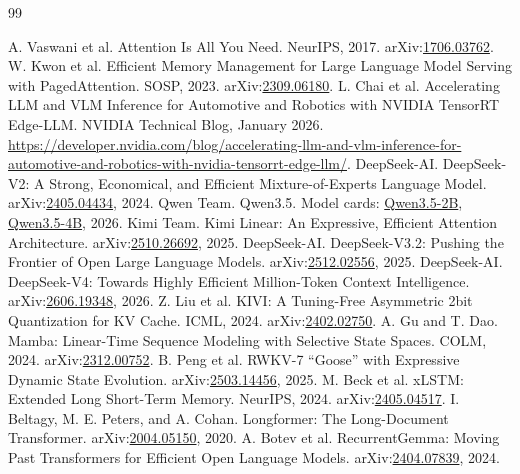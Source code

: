 \begingroup
\small
{}
\setlength{\parskip}{0pt}
\begin{thebibliography}{99}
\raggedright
\setlength{\itemsep}{0pt}
 A. Vaswani et al. Attention Is All You Need. NeurIPS, 2017. arXiv:\href{https://arxiv.org/abs/1706.03762}{1706.03762}.
 W. Kwon et al. Efficient Memory Management for Large Language Model Serving with PagedAttention. SOSP, 2023. arXiv:\href{https://arxiv.org/abs/2309.06180}{2309.06180}.
 L. Chai et al. Accelerating LLM and VLM Inference for Automotive and Robotics with NVIDIA TensorRT Edge-LLM. NVIDIA Technical Blog, January 2026. \url{https://developer.nvidia.com/blog/accelerating-llm-and-vlm-inference-for-automotive-and-robotics-with-nvidia-tensorrt-edge-llm/}.
 DeepSeek-AI. DeepSeek-V2: A Strong, Economical, and Efficient Mixture-of-Experts Language Model. arXiv:\href{https://arxiv.org/abs/2405.04434}{2405.04434}, 2024.
 Qwen Team. Qwen3.5. Model cards: \href{https://huggingface.co/Qwen/Qwen3.5-2B}{Qwen3.5-2B}, \href{https://huggingface.co/Qwen/Qwen3.5-4B}{Qwen3.5-4B}, 2026.
 Kimi Team. Kimi Linear: An Expressive, Efficient Attention Architecture. arXiv:\href{https://arxiv.org/abs/2510.26692}{2510.26692}, 2025.
 DeepSeek-AI. DeepSeek-V3.2: Pushing the Frontier of Open Large Language Models. arXiv:\href{https://arxiv.org/abs/2512.02556}{2512.02556}, 2025.
 DeepSeek-AI. DeepSeek-V4: Towards Highly Efficient Million-Token Context Intelligence. arXiv:\href{https://arxiv.org/abs/2606.19348}{2606.19348}, 2026.
 Z. Liu et al. KIVI: A Tuning-Free Asymmetric 2bit Quantization for KV Cache. ICML, 2024. arXiv:\href{https://arxiv.org/abs/2402.02750}{2402.02750}.
 A. Gu and T. Dao. Mamba: Linear-Time Sequence Modeling with Selective State Spaces. COLM, 2024. arXiv:\href{https://arxiv.org/abs/2312.00752}{2312.00752}.
 B. Peng et al. RWKV-7 ``Goose'' with Expressive Dynamic State Evolution. arXiv:\href{https://arxiv.org/abs/2503.14456}{2503.14456}, 2025.
 M. Beck et al. xLSTM: Extended Long Short-Term Memory. NeurIPS, 2024. arXiv:\href{https://arxiv.org/abs/2405.04517}{2405.04517}.
 I. Beltagy, M. E. Peters, and A. Cohan. Longformer: The Long-Document Transformer. arXiv:\href{https://arxiv.org/abs/2004.05150}{2004.05150}, 2020.
 A. Botev et al. RecurrentGemma: Moving Past Transformers for Efficient Open Language Models. arXiv:\href{https://arxiv.org/abs/2404.07839}{2404.07839}, 2024.

\end{thebibliography}
